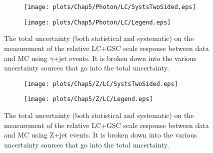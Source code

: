 \begin{figure}[!ht]
\captionsetup[subfigure]{labelformat=empty}
 \begin{center}
   \begin{subfigure}{0.55\textwidth}
     \hspace{-3cm}
     \texttt{[image: plots/Chap5/Photon/LC/SystsTwoSided.eps]}
   \end{subfigure}
   \begin{subfigure}{0.55\textwidth}
     \hspace{-3.cm}
     \texttt{[image: plots/Chap5/Photon/LC/Legend.eps]}
   \end{subfigure}
 \end{center}
 \caption[Uncertainty on the LC+GSC scale response measurement using $\gamma$+jet]
 {\small The total uncertainty (both statistical and systematic) on the measurement of the relative LC+GSC scale response between data and MC using $\gamma$+jet events.  It is broken down into the various uncertainty sources that go into the total uncertainty.  }
 \label{Fig:gJetSystsLC2016}
\end{figure}

\begin{figure}[!ht]
\captionsetup[subfigure]{labelformat=empty}
 \begin{center}
   \begin{subfigure}{0.55\textwidth}
     \hspace{-3cm}
     \texttt{[image: plots/Chap5/Z/LC/SystsTwoSided.eps]}
   \end{subfigure}
   \begin{subfigure}{0.55\textwidth}
     \hspace{-3cm}
     \texttt{[image: plots/Chap5/Z/LC/Legend.eps]}
   \end{subfigure}
 \end{center}
 \caption[Uncertainty on the LC+GSC scale response measurement using Z+jet]
 {\small The total uncertainty (both statistical and systematic) on the measurement of the relative LC+GSC scale response between data and MC using Z+jet events.  It is broken down into the various uncertainty sources that go into the total uncertainty.  }
 \label{Fig:ZJetSystsLC2016}
\end{figure}



